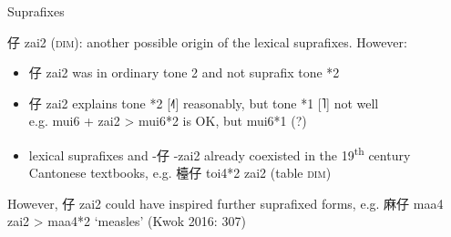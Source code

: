 \documentclass{beamer}
\begin{document}
\begin{frame}[fragile]{Suprafixes}

仔 zai2 (\textsc{dim}): another possible origin of the lexical suprafixes. 
However:\\
\begin{itemize}
    \item 仔 zai2 was in ordinary tone 2 and not suprafix tone *2\\
    \item 仔 zai2 explains tone *2 [˨˥] reasonably, but tone *1 [˥] not well\\
    {\scriptsize e.g. mui6 + zai2 > mui6*2 is OK, but mui6*1 (?)}
    \item lexical suprafixes and -仔 -zai2 already coexisted in the 19\textsuperscript{th} century Cantonese textbooks, e.g. 檯仔 toi4*2 zai2 (table \textsc{dim})\\
\end{itemize}
\smallskip
{\footnotesize However, 仔 zai2 could have inspired further suprafixed forms, e.g. 麻仔 maa4 zai2 > maa4*2 \enquote*{measles} (Kwok 2016: 307)}

\vfill {}

\end{frame}
\end{document}
